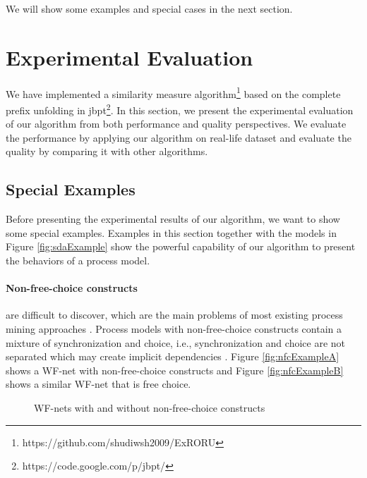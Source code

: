\documentclass{llncs}
\begin{document}
We will show some examples and special cases in the next section.

\section{Experimental Evaluation}\label{sec:experiments}
We have implemented a similarity measure algorithm\footnote{https://github.com/shudiwsh2009/ExRORU} based on the complete prefix unfolding in jbpt\footnote{https://code.google.com/p/jbpt/}. In this section, we present the experimental evaluation of our algorithm from both performance and quality perspectives. We evaluate the performance by applying our algorithm on real-life dataset and evaluate the quality by comparing it with other algorithms.

\subsection{Special Examples}\label{subsec:specialExamples}
Before presenting the experimental results of our algorithm, we want to show some special examples. Examples in this section together with the models in Figure \ref{fig:sdaExample} show the powerful capability of our algorithm to present the behaviors of a process model.

\paragraph{Non-free-choice constructs}\label{par:nfc} 
are difficult to discover, which are the main problems of most existing process mining approaches \cite{de2003workflow}. Process models with non-free-choice constructs contain a mixture of synchronization and choice, i.e., synchronization and choice are not separated which may create implicit dependencies \cite{wen2007mining}. Figure \ref{fig:nfcExampleA} shows a WF-net with non-free-choice constructs and Figure \ref{fig:nfcExampleB} shows a similar WF-net that is free choice.

\begin{figure}[htbp]
\centering
{}
\hspace{0.5cm}
\caption{WF-nets with and without non-free-choice constructs\label{fig:nfcExample}}
\end{figure}
\end{document}
